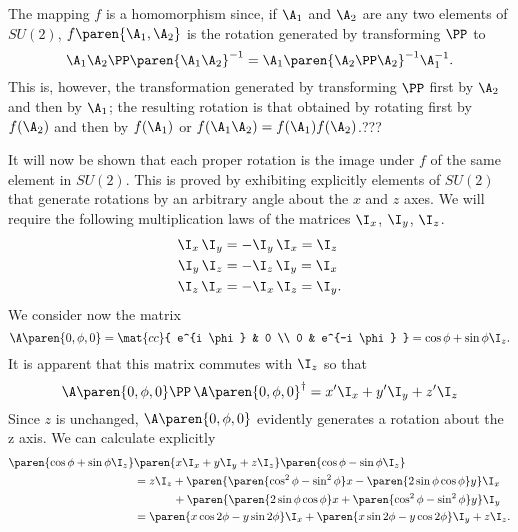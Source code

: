 The mapping $f$ is a homomorphism since, if $\A_{1}$ and $\A_{2}$ are any two elements of $SU(2)$, $f\paren{\A_{1}, \A_{2}} $ is the rotation generated by transforming $\PP$ to 
\begin{equation*}
  \A_{1}\A_{2} \PP \paren{\A_{1}\A_{2}}^{-1} = \A_{1} \paren{\A_{2} \PP \A_{2}}^{-1} \A_{1}^{-1}.
\end{equation*}
This is, however, the transformation generated by transforming $\PP$ first by $\A_{2}$ and then by $\A_{1}$; the resulting rotation is that obtained by rotating first by $f(\A_{2})$ and then by $f(\A_{1})$ or $f(\A_{1}\A_{2}) = f(\A_{1}) f(\A_{2})$.???

It will now be shown that each proper rotation is the image under $f$ of the same element in $SU(2)$. This is proved by exhibiting explicitly elements of $SU(2)$ that generate rotations by an arbitrary angle about the $x$ and $z$ axes. We will require the following multiplication laws of the matrices $\I_{x}$, $\I_{y}$, $\I_{z}$.
\begin{equation}
  \begin{split}
    \I_{x} \, \I_{y} &= -\I_{y} \, \I_{x} = \I_{z} \\
    \I_{y} \, \I_{z} &= -\I_{z} \, \I_{y} = \I_{x} \\
    \I_{z} \, \I_{x} &= -\I_{x} \, \I_{z} = \I_{y} .
  \end{split}
\end{equation}
We consider now the matrix
\begin{equation}
  \A \paren{0, \phi, 0}  = \mat{cc}{
    e^{i \phi} & 0 \\ 0 & e^{-i \phi}
  } = \cos \phi + \sin \phi \I_{z} .
\end{equation}
It is apparent that this matrix commutes with $\I_{z}$ so that
\begin{equation}
  \A \paren{0, \phi, 0} \PP \,  \A \paren{0, \phi, 0}^{\dagger} = x' \I_{x} + y' \I_{y} + z' \I_{z}
\end{equation}
Since $z$ is unchanged, $\A \paren{0, \phi, 0}$ evidently generates a rotation about the z axis. We can calculate explicitly
\begin{equation*}
  \begin{split}
    \paren{\cos \phi + \sin \phi \I_{z}} &\paren{x \I_{x} + y \I_{y} + z \I_{z}} \paren{\cos \phi - \sin \phi \I_{z}} \\
    &= z \I_{z} + \paren{ \paren{\cos^{2}\phi - \sin^{2}\phi}x - \paren{2 \sin \phi \cos \phi} y } \I_{x} \\
    &\phantom{= z \I_{z}\ } + \paren{ \paren{2 \sin \phi \cos \phi} x + \paren{\cos^{2}\phi - \sin^{2}\phi}y} \I_{y} \\
    &= \paren{ x \cos 2 \phi - y \sin 2 \phi} \I_{x} 
     + \paren{ x \sin 2 \phi - y \cos 2 \phi} \I_{y} 
     + z \I_{z} .
  \end{split}
\end{equation*}
